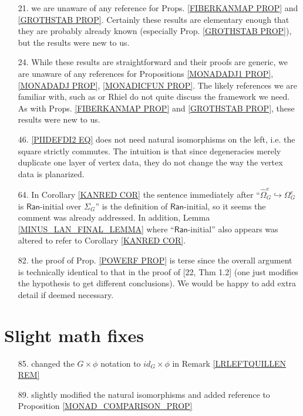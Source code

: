 \documentclass{article}
\begin{document}
\begin{itemize}
	\item[21.] we are unaware of any reference for Props. 
	\ref{FIBERKANMAP PROP} and \ref{GROTHSTAB PROP}.
	Certainly these results are elementary enough that they are probably already known (especially Prop. \ref{GROTHSTAB PROP}),
	but the results were new to us. 
	\item[24.] While these results are straightforward 
	and their proofs are generic, 
	we are unaware of any references for Propositions \ref{MONADADJ1 PROP}, \ref{MONADADJ PROP}, \ref{MONADICFUN PROP}. The likely references we are familiar with, such as 
	\cite{Bo94} or {\color{red} Rhiel} do not quite discuss the framework we need.
	As with Props. 
	\ref{FIBERKANMAP PROP} and \ref{GROTHSTAB PROP},
	these results were new to us.
	\item[46.] \eqref{PIIDEFDI2 EQ} does not need natural isomorphisms on the left, i.e. the square strictly commutes. The intuition is that since degeneracies merely duplicate one layer of vertex data, they do not change the way the vertex data is planarized. 
	\item[64.]
	In Corollary \ref{KANRED COR} the sentence immediately after ``$\widehat{\Omega}^e_G \hookrightarrow \Omega^e_G$ is
	$\mathsf{Ran}$-initial over $\Sigma_G$''
	is the definition of $\mathsf{Ran}$-initial,
	so it seems the comment was already addressed.
	In addition, Lemma \ref{MINUS_LAN_FINAL_LEMMA} where ``$\mathsf{Ran}$-initial'' also appears was altered to refer to Corollary \ref{KANRED COR}.
	\item[82.] the proof of Prop. \ref{POWERF PROP} is terse since the overall argument is technically identical to that in the proof of [22, Thm 1.2] (one just modifies the hypothesis to get different conclusions).
	We would be happy to add extra detail if deemed necessary. 
\end{itemize} 

\section{Slight math fixes}

\begin{itemize}
	\item[85.] changed the $G \times \phi$ notation 
	to $id_G \times \phi$ in Remark \ref{LRLEFTQUILLEN REM}
	
	\item[89.] slightly modified the natural isomorphisms and added reference to Proposition \ref{MONAD_COMPARISON_PROP} 
\end{itemize}
\end{document}
